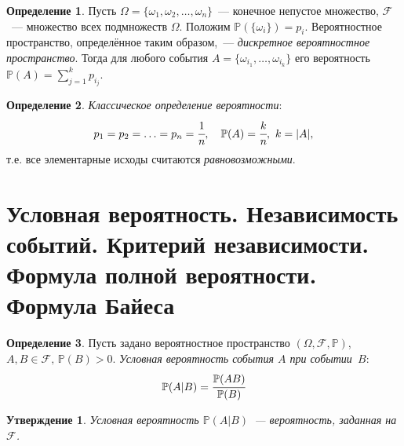 \documentclass[oneside,final,14pt]{extreport}
\newcommand\myprob[1]{{\mathbb{P}(#1)}}
\theoremstyle{plain}
\newtheorem*{thm*}{Утверждение}
\theoremstyle{definition}
\newtheorem*{defn}{Определение}
\theoremstyle{named}
\begin{document}
\begin{defn}
    Пусть $\Omega = \{\omega_1, \omega_2, \ldots, \omega_n\}$~--- конечное непустое множество, $\mathcal{F}$~--- множество всех подмножеств $\Omega$. Положим $\myprob{\{\omega_i\}} = p_i$. Вероятностное пространство, определённое таким образом,~--- {\it дискретное вероятностное пространство}. Тогда для любого события $A = \{\omega_{i_1}, \ldots, \omega_{i_k}\}$ его вероятность $\myprob{A} = \sum\limits_{j=1}^k p_{i_j}$.
\end{defn}

\begin{defn}
    {\it Классическое определение вероятности}:
    \begin{equation*}
        p_1 = p_2 = \ldots =p_n=\cfrac{1}{n}, \quad \myprob{A} = \cfrac{k}{n},~ k=|A|,
    \end{equation*}
    т.е. все элементарные исходы считаются {\it равновозможными}.
\end{defn}

\section {Условная вероятность. Независимость событий. Критерий независимости. Формула полной вероятности. Формула Байеса}

\begin{defn}
    Пусть задано вероятностное пространство $(\Omega, \mathcal{F}, \mathbb{P})$, ${A, B \in \mathcal{F}, \, \myprob{B} > 0}$. {\it Условная вероятность события $A$ при событии~$B$}:
    \begin{equation*}
        \myprob{A|B}=\cfrac{\myprob{AB}}{\myprob{B}}
    \end{equation*}
\end{defn}

\begin{thm*}
    Условная вероятность $\myprob{A|B}$~--- вероятность, заданная на $\mathcal{F}$.
\end{thm*}
\end{document}
